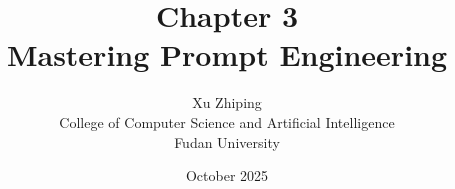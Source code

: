 \documentclass[11pt,letterpaper]{book}
\begin{document}
\title{Chapter 3\\
\large Mastering Prompt Engineering}
\author{Xu Zhiping\\
\small College of Computer Science and Artificial Intelligence\\
\small Fudan University}
\date{October 2025}
\maketitle

\tableofcontents

\setcounter{chapter}{2}




\printindex
\end{document}
